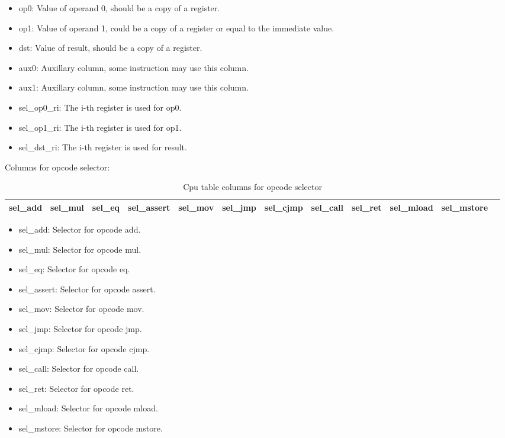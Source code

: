 \begin{itemize}
    \item op0: Value of operand 0, should be a copy of a register.
    \item op1: Value of operand 1, could be a copy of a register or equal to the immediate value.
    \item dst: Value of result, should be a copy of a register.
    \item aux0: Auxillary column, some instruction may use this column.
    \item aux1: Auxillary column, some instruction may use this column.
    \item sel\_op0\_ri: The i-th register is used for op0.
    \item sel\_op1\_ri: The i-th register is used for op1.
    \item sel\_dst\_ri: The i-th register is used for result.
\end{itemize}

Columns for opcode selector:
\begin{table}[!ht]
    \centering
    \begin{tabular}{|c|c|c|c|c|c|c|c|c|c|c|c|}
        \hline
        sel\_add & sel\_mul & sel\_eq & sel\_assert & sel\_mov & sel\_jmp & sel\_cjmp & sel\_call & sel\_ret & sel\_mload & sel\_mstore \\
        \hline
    \end{tabular}
    \caption{Cpu table columns for opcode selector}
    \label{table:cpu-columns-opcode-selector}
\end{table}

\begin{itemize}
    \item sel\_add: Selector for opcode add.
    \item sel\_mul: Selector for opcode mul.
    \item sel\_eq: Selector for opcode eq.
    \item sel\_assert: Selector for opcode assert.
    \item sel\_mov: Selector for opcode mov.
    \item sel\_jmp: Selector for opcode jmp.
    \item sel\_cjmp: Selector for opcode cjmp.
    \item sel\_call: Selector for opcode call.
    \item sel\_ret: Selector for opcode ret.
    \item sel\_mload: Selector for opcode mload.
    \item sel\_mstore: Selector for opcode mstore.
\end{itemize}

